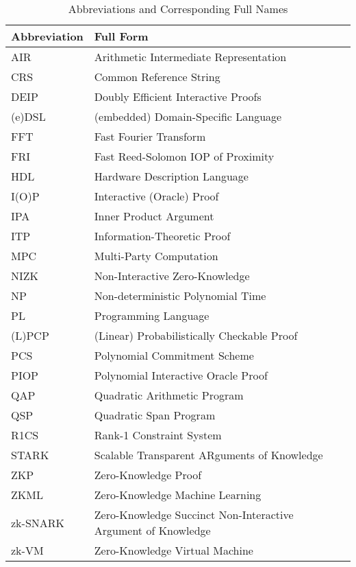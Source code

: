 \documentclass[letterpaper,twocolumn,10pt]{article}
\theoremstyle{definition}
\newcommand{\new}[1]{{#1}\xspace}
\begin{document}
\begin{table}[t]
	\centering
	\begin{tabularx}{\linewidth}{p{1.7cm} X}
		\hline
		\textbf{Abbreviation} & \textbf{Full Form} \\
		\hline
		AIR & Arithmetic Intermediate Representation \\
		CRS & Common Reference String \\ 
		DEIP & Doubly Efficient Interactive Proofs \\ 
		(e)DSL & (embedded) Domain-Specific Language \\ 
		FFT & Fast Fourier Transform \\ 
		FRI & {Fast Reed-Solomon IOP of Proximity} \\ 
		HDL & Hardware Description Language\\
		I(O)P & Interactive (Oracle) Proof \\ 
		IPA & Inner Product Argument \\
		ITP & Information-Theoretic Proof \\
		MPC & Multi-Party Computation \\ 
		NIZK & Non-Interactive Zero-Knowledge \\ 
		NP & Non-deterministic Polynomial Time \\ 
		PL & Programming Language\\
		(L)PCP & (Linear) Probabilistically Checkable Proof \\ 
		PCS & Polynomial Commitment Scheme \\ 
		PIOP & {Polynomial Interactive Oracle Proof} \\ 
		QAP & Quadratic Arithmetic Program \\ 
		QSP & Quadratic Span Program \\ 
		R1CS & Rank-1 Constraint System \\ 
		{STARK} & {Scalable Transparent ARguments of Knowledge} \\ 
		ZKP & Zero-Knowledge Proof \\ 
		ZKML & Zero-Knowledge Machine Learning\\
		{zk-SNARK} & {Zero-Knowledge Succinct Non-Interactive Argument of Knowledge} \\ 
		zk-VM & Zero-Knowledge Virtual Machine \\ 
		\bottomrule
	\end{tabularx}
	\caption{\new{Abbreviations and Corresponding Full Names}}
	\label{abbr}
\end{table}
\end{document}

